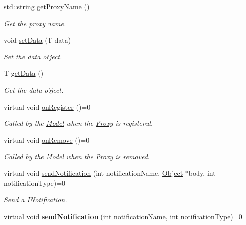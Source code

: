 \begin{DoxyCompactItemize}
\item 
std::string \hyperlink{class_pure_m_v_c_1_1_proxy_a1aad6dd9244cd07361afb0bb5829b09d}{getProxyName} ()
\begin{DoxyCompactList}\small\item\em Get the proxy name. \item\end{DoxyCompactList}\item 
void \hyperlink{class_pure_m_v_c_1_1_proxy_ae14f7e555987a8e25584067a0e96c32a}{setData} (T data)
\begin{DoxyCompactList}\small\item\em Set the data object. \item\end{DoxyCompactList}\item 
T \hyperlink{class_pure_m_v_c_1_1_proxy_a717242b7e7053d768d08ac5972ab8688}{getData} ()
\begin{DoxyCompactList}\small\item\em Get the data object. \item\end{DoxyCompactList}\item 
virtual void \hyperlink{class_pure_m_v_c_1_1_i_proxy_restricted_a450f14bba0bde7c94e5868e844f1fdf2}{onRegister} ()=0
\begin{DoxyCompactList}\small\item\em Called by the \hyperlink{class_pure_m_v_c_1_1_model}{Model} when the \hyperlink{class_pure_m_v_c_1_1_proxy}{Proxy} is registered. \item\end{DoxyCompactList}\item 
virtual void \hyperlink{class_pure_m_v_c_1_1_i_proxy_restricted_a6d883fcf5a5e241321f5b5d9521ba158}{onRemove} ()=0
\begin{DoxyCompactList}\small\item\em Called by the \hyperlink{class_pure_m_v_c_1_1_model}{Model} when the \hyperlink{class_pure_m_v_c_1_1_proxy}{Proxy} is removed. \item\end{DoxyCompactList}\item 
virtual void \hyperlink{class_pure_m_v_c_1_1_i_notifier_a65e8333ccfea74138b79f84dac96af25}{sendNotification} (int notificationName, \hyperlink{class_pure_m_v_c_1_1_object}{Object} $\ast$body, int notificationType)=0
\begin{DoxyCompactList}\small\item\em Send a {\ttfamily \hyperlink{class_pure_m_v_c_1_1_i_notification}{INotification}}. \item\end{DoxyCompactList}\item 
\hypertarget{class_pure_m_v_c_1_1_i_notifier_ad9421945c1e0fd6d7ebbc136f9ecfba3}{
virtual void {\bfseries sendNotification} (int notificationName, int notificationType)=0}
\label{class_pure_m_v_c_1_1_i_notifier_ad9421945c1e0fd6d7ebbc136f9ecfba3}


\end{DoxyCompactItemize}
